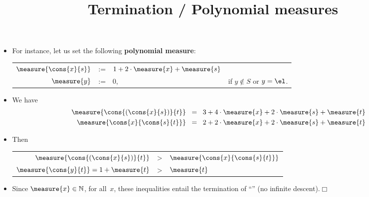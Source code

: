 \documentclass[wide]{slides}
\begin{document}
\begin{slide}
  \title{Termination / Polynomial measures}

  \begin{itemize}

    \item For instance, let us set the following \textbf{polynomial
      measure}:
      \begin{center}
        \begin{tabular}{r@{\;\,}c@{\;\;}ll}
          \(\measure{\cons{x}{s}}\) & := & \(1 + 2\cdot\measure{x} +
          \measure{s}\)\\
          \(\measure{y}\) & := & \(0\), & if \(y \not\in S\) or
          \(y=\el\).
        \end{tabular}
      \end{center}

    \item We have
      \begin{align*}
        \measure{\cons{(\cons{x}{s})}{t}} & \;\; = \;\; 3 +
        4\cdot\measure{x} + 2\cdot\measure{s} + \measure{t}\\
        \measure{\cons{x}{\cons{s}{t}}} & \;\; = \;\; 2 +
        2\cdot\measure{x} + 2\cdot\measure{s} + \measure{t}
      \end{align*}

    \item Then
      \begin{center}
        \begin{tabular}{r@{\;\;}c@{\;\;}l}
          \(\measure{\cons{(\cons{x}{s})}{t}}\) & >
          & \(\measure{\cons{x}{\cons{s}{t}}}\)\\
          \(\measure{\cons{y}{t}} = 1 + \measure{t}\) & > &
          \(\measure{t}\)
        \end{tabular}
      \end{center}

    \item Since \(\measure{x} \in \mathbb{N}\), for all~\(x\), these
      inequalities entail the termination of ``'' (no
      infinite descent).\hfill\(\Box\)

  \end{itemize}

\end{slide}


\end{document}
